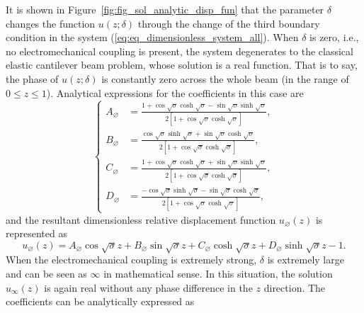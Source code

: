 \documentclass{article}
\begin{document}
It is shown in Figure~\ref{fig:fig_sol_analytic_disp_fun} that the parameter $\delta$ changes the function $u(z;\delta)$ through the change of the third boundary condition in the system (\ref{eq:eq_dimensionless_system_all}). When $\delta$ is zero, i.e., no electromechanical coupling is present, the system degenerates to the classical elastic cantilever beam problem, whose solution is a real function. That is to say, the phase of $u(z;\delta)$ is constantly zero across the whole beam (in the range of $0 \leq z \leq 1$).
Analytical expressions for the coefficients in this case are 
\begin{equation}
    \left\{\begin{aligned}
        A_{\varnothing} &= \frac{ 1 + \cos\sqrt{\sigma } \cosh\sqrt{\sigma } - \sin\sqrt{\sigma } \sinh\sqrt{\sigma} }{2 \left[ 1 + \cos\sqrt{\sigma } \cosh\sqrt{\sigma } \right]}, \\
        B_{\varnothing} &= \frac{ \cos\sqrt{\sigma } \sinh\sqrt{\sigma } + \sin\sqrt{\sigma } \cosh\sqrt{\sigma} }{2 \left[ 1 + \cos\sqrt{\sigma } \cosh\sqrt{\sigma } \right]}, \\
        C_{\varnothing} &= \frac{ 1 + \cos\sqrt{\sigma } \cosh\sqrt{\sigma } + \sin\sqrt{\sigma } \sinh\sqrt{\sigma} }{2 \left[ 1 + \cos\sqrt{\sigma } \cosh\sqrt{\sigma } \right]}, \\
        D_{\varnothing} &= \frac{ -\cos\sqrt{\sigma } \sinh\sqrt{\sigma } - \sin\sqrt{\sigma } \cosh\sqrt{\sigma} }{2 \left[ 1 + \cos\sqrt{\sigma } \cosh\sqrt{\sigma } \right]},
    \end{aligned}\right.
    \label{eq:eq_disp_func_coeffs_exps_zero}
\end{equation}
and the resultant dimensionless relative displacement function $u_{\varnothing} (z)$ is represented as
\begin{equation}
    u_{\varnothing} (z) = A_{\varnothing} \cos{\sqrt{\sigma}z} + B_{\varnothing} \sin{\sqrt{\sigma}z} + C_{\varnothing} \cosh{\sqrt{\sigma}z} + D_{\varnothing} \sinh{\sqrt{\sigma}z} - 1.
\end{equation}
When the electromechanical coupling is extremely strong, $\delta$ is extremely large and can be seen as $\infty$ in mathematical sense. In this situation, the solution $u_\infty (z)$ is again real without any phase difference in the $z$ direction. The coefficients can be analytically expressed as 
\end{document}
